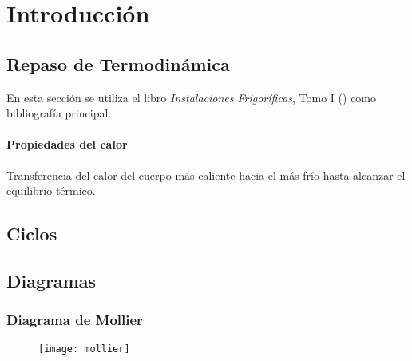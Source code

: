 \chapter{Introducción}

	\section{Repaso de Termodinámica}
	
		En esta sección se utiliza el libro \textit{Instalaciones Frigoríficas}, Tomo I (\cite{rapin1997instalaciones}) como bibliografía principal.
		
		
		\subsubsection{Propiedades del calor}
		
		Transferencia del calor del cuerpo más caliente hacia el más frío hasta alcanzar el equilibrio térmico.
		
	\section{Ciclos}
	
	\section{Diagramas}
	
	\subsection{Diagrama de Mollier}
	
	\begin{figure}[h]
		\centering
		\texttt{[image: mollier]}
	\end{figure}
	
		
		